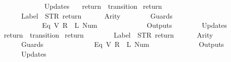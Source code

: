 \begin{isabellebody}
\ \ \ \ \ \ {\isacharbrackright}{\isacharcomma}\isanewline
\ \ \ \ \ \ Updates\ {\isacharequal}\ {\isacharbrackleft}{\isacharbrackright}\isanewline
{\isasymrparr}{\isachardoublequoteclose}\isanewline
\isanewline
{}\isamarkupfalse%
\ {\isachardoublequoteopen}return{}{\isachardoublequoteclose}\ {\isacharcolon}{\isacharcolon}\ {\isachardoublequoteopen}transition{\isachardoublequoteclose}\ \isanewline
{\isachardoublequoteopen}return{}\ {\isasymequiv}\ {\isasymlparr}\isanewline
\ \ \ \ \ \ Label\ {\isacharequal}\ STR\ {\isacharprime}{\isacharprime}return{\isacharprime}{\isacharprime}{\isacharcomma}\isanewline
\ \ \ \ \ \ Arity\ {\isacharequal}\ {}{\isacharcomma}\isanewline
\ \ \ \ \ \ Guards\ {\isacharequal}\ {\isacharbrackleft}\isanewline
\ \ \ \ \ \ \ \ \ \ \ \ {\isacharparenleft}Eq\ {\isacharparenleft}V\ {\isacharparenleft}R\ {}{\isacharparenright}{\isacharparenright}\ {\isacharparenleft}L\ {\isacharparenleft}Num\ {}{\isacharparenright}{\isacharparenright}{\isacharparenright}\isanewline
\ \ \ \ \ \ {\isacharbrackright}{\isacharcomma}\isanewline
\ \ \ \ \ \ Outputs\ {\isacharequal}\ {\isacharbrackleft}{\isacharbrackright}{\isacharcomma}\isanewline
\ \ \ \ \ \ Updates\ {\isacharequal}\ {\isacharbrackleft}{\isacharbrackright}\isanewline
{\isasymrparr}{\isachardoublequoteclose}\isanewline
\isanewline
{}\isamarkupfalse%
\ {\isachardoublequoteopen}return{}{\isachardoublequoteclose}\ {\isacharcolon}{\isacharcolon}\ {\isachardoublequoteopen}transition{\isachardoublequoteclose}\ \isanewline
{\isachardoublequoteopen}return{}\ {\isasymequiv}\ {\isasymlparr}\isanewline
\ \ \ \ \ \ Label\ {\isacharequal}\ STR\ {\isacharprime}{\isacharprime}return{\isacharprime}{\isacharprime}{\isacharcomma}\isanewline
\ \ \ \ \ \ Arity\ {\isacharequal}\ {}{\isacharcomma}\isanewline
\ \ \ \ \ \ Guards\ {\isacharequal}\ {\isacharbrackleft}\isanewline
\ \ \ \ \ \ \ \ \ \ \ \ {\isacharparenleft}Eq\ {\isacharparenleft}V\ {\isacharparenleft}R\ {}{\isacharparenright}{\isacharparenright}\ {\isacharparenleft}L\ {\isacharparenleft}Num\ {}{\isacharparenright}{\isacharparenright}{\isacharparenright}\isanewline
\ \ \ \ \ \ {\isacharbrackright}{\isacharcomma}\isanewline
\ \ \ \ \ \ Outputs\ {\isacharequal}\ {\isacharbrackleft}{\isacharbrackright}{\isacharcomma}\isanewline
\ \ \ \ \ \ Updates\ {\isacharequal}\ {\isacharbrackleft}{\isacharbrackright}\isanewline
{\isasymrparr}{\isachardoublequoteclose}\isanewline

\end{isabellebody}
